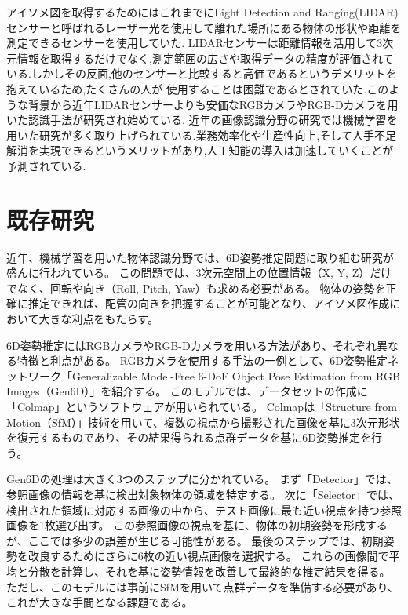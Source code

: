 アイソメ図を取得するためにはこれまでにLight Detection and Ranging(LIDAR)センサーと呼ばれるレーザー光を使用して離れた場所にある物体の形状や距離を測定できるセンサーを使用していた.
LIDARセンサーは距離情報を活用して3次元情報を取得するだけでなく,測定範囲の広さや取得データの精度が評価されている.しかしその反面,他のセンサーと比較すると高価であるというデメリットを抱えているため,たくさんの人が
使用することは困難であるとされていた.このような背景から近年LIDARセンサーよりも安価なRGBカメラやRGB-Dカメラを用いた認識手法が研究され始めている.
近年の画像認識分野の研究では機械学習を用いた研究が多く取り上げられている.業務効率化や生産性向上,そして人手不足解消を実現できるというメリットがあり,人工知能の導入は加速していくことが予測されている.


\section{既存研究}
近年、機械学習を用いた物体認識分野では、6D姿勢推定問題に取り組む研究が盛んに行われている。
この問題では、3次元空間上の位置情報（X, Y, Z）だけでなく、回転や向き（Roll, Pitch, Yaw）も求める必要がある。
物体の姿勢を正確に推定できれば、配管の向きを把握することが可能となり、アイソメ図作成において大きな利点をもたらす。

6D姿勢推定にはRGBカメラやRGB-Dカメラを用いる方法があり、それぞれ異なる特徴と利点がある。
RGBカメラを使用する手法の一例として、6D姿勢推定ネットワーク「Generalizable Model-Free 6-DoF Object Pose Estimation from RGB Images（Gen6D）」を紹介する。
このモデルでは、データセットの作成に「Colmap」というソフトウェアが用いられている。
Colmapは「Structure from Motion（SfM）」技術を用いて、複数の視点から撮影された画像を基に3次元形状を復元するものであり、その結果得られる点群データを基に6D姿勢推定を行う。

Gen6Dの処理は大きく3つのステップに分かれている。
まず「Detector」では、参照画像の情報を基に検出対象物体の領域を特定する。
次に「Selector」では、検出された領域に対応する画像の中から、テスト画像に最も近い視点を持つ参照画像を1枚選び出す。
この参照画像の視点を基に、物体の初期姿勢を形成するが、ここでは多少の誤差が生じる可能性がある。
最後のステップでは、初期姿勢を改良するためにさらに6枚の近い視点画像を選択する。
これらの画像間で平均と分散を計算し、それを基に姿勢情報を改善して最終的な推定結果を得る。
ただし、このモデルには事前にSfMを用いて点群データを準備する必要があり、これが大きな手間となる課題である。

